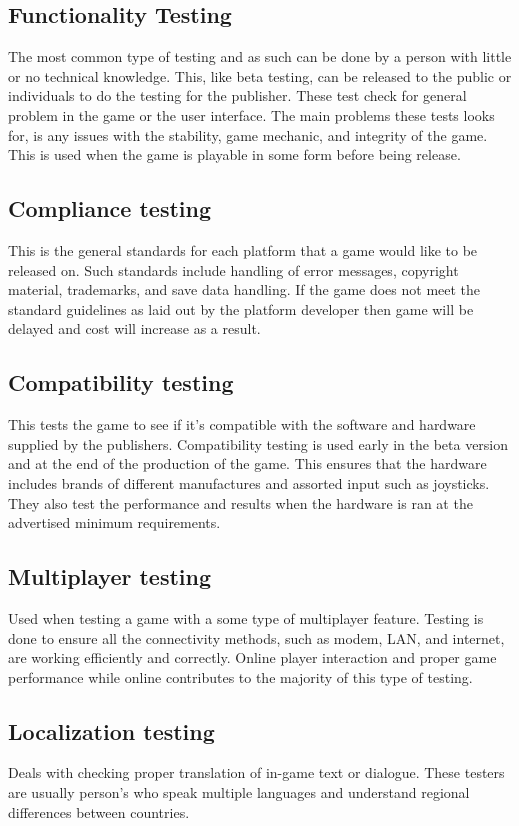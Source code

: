\subsection{Functionality Testing} The most common type of testing and as such can be done by a person with little or no technical knowledge. This, like beta testing, can be released to the public or individuals to do the testing for the publisher. These test check for general problem in the game or the user interface. The main problems these tests looks for, is any issues with the stability, game mechanic, and integrity of the game. This is used when the game is playable in some form before being release.

\subsection{Compliance testing}  This is the general standards for each platform that a game would like to be released on.  Such standards include handling of error messages, copyright material, trademarks, and save data handling. If the game does not meet the standard guidelines as laid out by the platform developer then game will be delayed and cost will increase as a result.

\subsection{Compatibility testing}  This tests the game to see if it’s compatible with the software and hardware supplied by the publishers.  Compatibility testing is used early in the beta version and at the end of the production of the game.  This ensures that the hardware includes brands of different manufactures and assorted input such as joysticks. They also test the performance and results when the hardware is ran at the advertised minimum requirements.

\subsection{Multiplayer testing} Used when testing a game with a some type of multiplayer feature. Testing is done to ensure all the connectivity methods, such as modem, LAN, and internet, are working efficiently and correctly. Online player interaction and proper game performance while online contributes to the majority of this type of testing.

\subsection{Localization testing} Deals with checking proper translation of in-game text or dialogue. These testers are usually person's who speak multiple languages and understand regional differences between countries.


